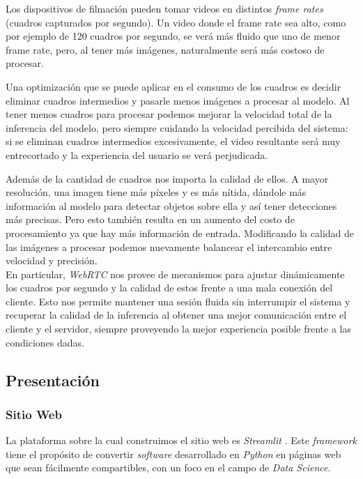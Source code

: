 \documentclass[a4paper]{article}
\begin{document}
Los dispositivos de filmación pueden tomar videos en distintos \textit{frame rates} (cuadros capturados por segundo). Un video donde el frame rate sea alto, como por ejemplo de 120 cuadros por segundo, se verá más fluido que uno de menor frame rate, pero, al tener más imágenes, naturalmente será más costoso de procesar.

Una optimización que se puede aplicar en el consumo de los cuadros es decidir eliminar cuadros intermedios y pasarle menos imágenes a procesar al modelo. Al tener menos cuadros para procesar podemos mejorar la velocidad total de la inferencia del modelo, pero siempre cuidando la velocidad percibida del sistema: si se eliminan cuadros intermedios excesivamente, el video resultante será muy entrecortado y la experiencia del usuario se verá perjudicada.

Además de la cantidad de cuadros nos importa la calidad de ellos. A mayor resolución, una imagen tiene más píxeles y es más nítida, dándole más información al modelo para detectar objetos sobre ella y así tener detecciones más precisas. Pero esto también resulta en un aumento del costo de procesamiento ya que hay más información de entrada. Modificando la calidad de las imágenes a procesar podemos nuevamente balancear el intercambio entre velocidad y precisión. \\

En particular, \textit{WebRTC} nos provee de mecanismos para ajustar dinámicamente los cuadros por segundo y la calidad de estos frente a una mala conexión del cliente. Esto nos permite mantener una sesión fluida sin interrumpir el sistema y recuperar la calidad de la inferencia al obtener una mejor comunicación entre el cliente y el servidor, siempre proveyendo la mejor experiencia posible frente a las condiciones dadas.

\subsection{Presentación}

\subsubsection{Sitio Web}

La plataforma sobre la cual construimos el sitio web es \textit{Streamlit} \cite{streamlit}. Este \textit{framework} tiene el propósito de convertir \textit{software} desarrollado en \textit{Python} en páginas web que sean fácilmente compartibles, con un foco en el campo de \textit{Data Science}.
\end{document}
